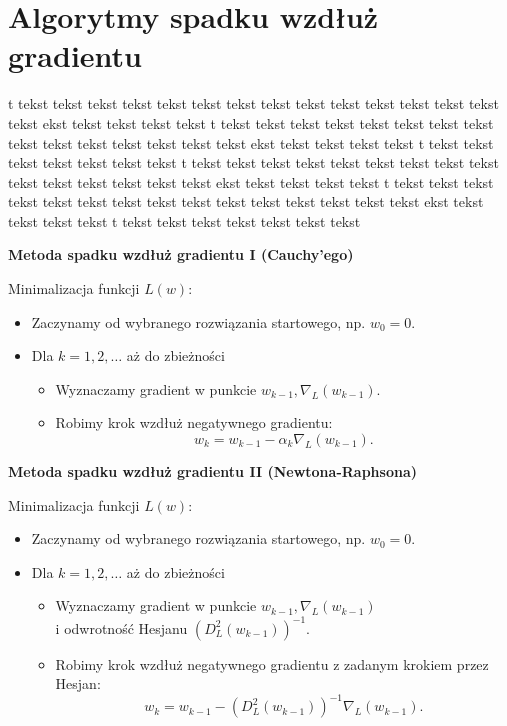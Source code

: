 \newpage
\section{Algorytmy spadku wzdłuż gradientu}

t tekst tekst tekst tekst tekst tekst tekst tekst tekst tekst tekst tekst tekst tekst tekst ekst tekst tekst tekst tekst t tekst tekst tekst tekst tekst tekst tekst tekst tekst tekst tekst tekst tekst tekst tekst ekst tekst tekst tekst tekst t tekst tekst tekst tekst tekst tekst tekst t tekst tekst tekst tekst tekst tekst tekst tekst tekst tekst tekst tekst tekst tekst tekst ekst tekst tekst tekst tekst t tekst tekst tekst tekst tekst tekst tekst tekst tekst tekst tekst tekst tekst tekst tekst ekst tekst tekst tekst tekst t tekst tekst tekst tekst tekst tekst tekst

\begin{center}
\textbf{Metoda spadku wzdłuż gradientu I (Cauchy’ego)}
\end{center}
Minimalizacja funkcji $L(w)$:
\begin{itemize}
\item Zaczynamy od wybranego rozwiązania startowego, np. $w_{0} = 0$.
\item Dla $k = 1, 2, \dots$ aż do zbieżności
	\begin{itemize}
	\item Wyznaczamy gradient w punkcie $w_{k-1}, \nabla_{L}(w_{k-1})$.
	\item Robimy krok wzdłuż negatywnego gradientu: $$w_{k} = w_{k-1} - \alpha_{k}\nabla_{L}(w_{k-1}). $$
	\end{itemize}
\end{itemize}

\begin{center}
\textbf{Metoda spadku wzdłuż gradientu II (Newtona-Raphsona)}
\end{center}
Minimalizacja funkcji $L(w)$:
\begin{itemize}
\item Zaczynamy od wybranego rozwiązania startowego, np. $w_{0} = 0$.
\item Dla $k = 1, 2, \dots$ aż do zbieżności
	\begin{itemize}
	\item Wyznaczamy gradient w punkcie $w_{k-1}, \nabla_{L}(w_{k-1})$ \\ i odwrotność Hesjanu $(D_{L}^{2}(w_{k-1}))^{-1}$.
	\item Robimy krok wzdłuż negatywnego gradientu z zadanym krokiem przez Hesjan: $$w_{k} = w_{k-1} - (D_{L}^{2}(w_{k-1}))^{-1}\nabla_{L}(w_{k-1}). $$
	\end{itemize}
\end{itemize}
